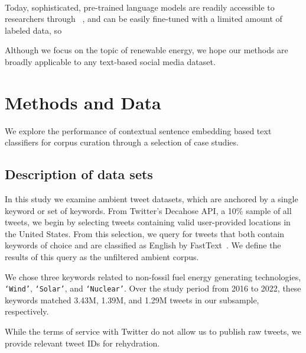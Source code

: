 \cite{gao2021limitations}\cite{chang2020taming}


~\cite{antypas2022twitter} ~\cite{quercia2012tweetlda}


Today, sophisticated, pre-trained language models are readily accessible to researchers through ~\cite{wolf2020transformers}, and can be easily fine-tuned with a limited amount of labeled data, so ~\cite{yan2018few,wang2020generalizing}

\cite{kim2020exploring, jain2019sentiment}


Although we focus on the topic of renewable energy, we hope our methods are broadly applicable
to any text-based social media dataset.

\section{Methods and Data}
\label{sec:corpusCreation.methods}



We explore the performance of contextual sentence embedding based text classifiers for corpus curation through a selection of case studies. 


\subsection{Description of data sets}
\label{sec:corpusCreation.data}

In this study we examine ambient tweet datasets,
which are anchored by a single keyword or set of keywords. 
From Twitter's Decahose API,
a 10\% sample of all tweets,
we begin by selecting tweets containing valid user-provided locations in the United States. 
From this selection, we query for tweets that both contain keywords of choice and are classified as English by FastText~\cite{joulin2017bag}.
We define the results of this query as the unfiltered ambient corpus.

We chose three keywords related to non-fossil fuel energy generating technologies, \texttt{`Wind'}, \texttt{`Solar'}, and \texttt{`Nuclear'}. 
Over the study period from 2016 to 2022, these keywords matched 3.43M, 1.39M, and 1.29M tweets in our subsample, respectively.

While the terms of service with Twitter do not allow us to publish raw tweets, we provide relevant tweet IDs for rehydration. 

